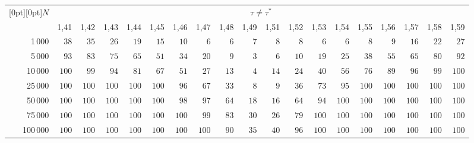 \begin{table}[b]
\begin{center}
\tabcolsep=3.8pt
\begin{tabular}{|r|r|r|r|r|r|r|r|r|r|r|r|r|r|r|r|r|r|r|}
\hline
\multicolumn{1}{|c|}{\raisebox{-6pt}[0pt][0pt]{$N$}}& \multicolumn{18}{c|}{$\tau\neq\tau^*$} \\
\cline{2-19}
 & 1,41 & 1,42 & 1,43 & 1,44 & 1,45 & 1,46 & 1,47 & 1,48 & 1,49
& 1,51 & 1,52 & 1,53 & 1,54 & 1,55 & 1,56 & 1,57 & 1,58 & 1,59 \\ 
\hline
1\,000 & $38$ & $35$ & $26$ & $19$ & $15$ & $10$ & $6$ & $6$ & $7$
& $8$ & $8$ & $6$ & $6$ & $8$ & $9$ & $16$ & $22$ & $27$  \\
5\,000 & $93$ & $83$ & $75$ & $65$ & $51$ & $34$ & $20$ & $9$ & $3$
& $6$ & $10$ & $19$ & $25$ & $38$ & $55$ & $65$ & $80$ & $92$ \\
10\,000 & $100$ & $99$ & $94$ & $81$ & $67$ & $51$ & $27$ & $13$ & $4$
& $14$ & $24$ & $40$ & $56$ & $76$ & $89$ & $96$ & $99$ & $100$ \\
25\,000 & $100$ & $100$ & $100$ & $100$ & $100$ & $96$ & $67$ & $33$ & $8$
& $9$ & $36$ & $73$ & $95$ & $100$ & $100$ & $100$ & $100$ & $100$ \\
50\,000 & $100$ & $100$ & $100$ & $100$ & $100$ & $98$ & $97$ & $64$ & $18$
& $16$ & $64$ & $94$ & $100$ & $100$ & $100$ & $100$ & $100$ & $100$ \\
75\,000 & $100$ & $100$ & $100$ & $100$ & $100$ & $100$ & $99$ & $83$ & $30$
& $26$ & $79$ & $100$ & $100$ & $100$ & $100$ & $100$ & $100$ & $100$ \\
100\,000 & $100$ & $100$ & $100$ & $100$ & $100$ & $100$ & $100$ & $90$ & $35$
& $40$ & $96$ & $100$ & $100$ & $100$ & $100$ & $100$ & $100$ & $100$ \\ \hline
\end{tabular}
\end{center}
\begin{center}
\vspace*{2ex}


\end{center}
\end{table}

